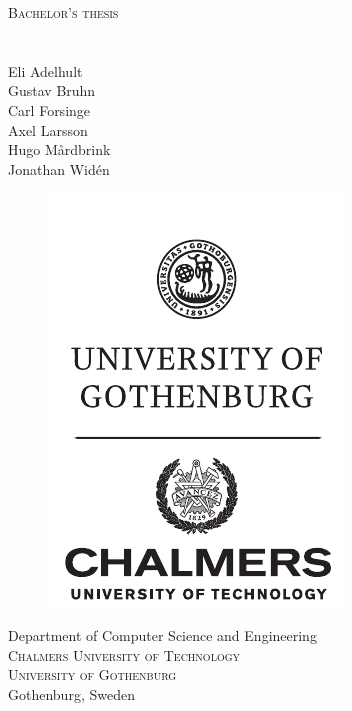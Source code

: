 \newpage
\restoregeometry
\thispagestyle{empty}
\mbox{}


\newpage
\thispagestyle{empty}
\begin{center}
	\textsc{\large Bachelor's thesis \the\year}\\[4cm]		%
	\textbf{\Large \multiLineTitle{0.2cm}} \\[1cm]
	{\large \oneLineSubtitle}\\[1cm]
	{\large Eli Adelhult}\\[1ex]
	{\large Gustav Bruhn}\\[1ex]
	{\large Carl Forsinge}\\[1ex]
	{\large Axel Larsson}\\[1ex]
	{\large Hugo Mårdbrink}\\[1ex]
	{\large Jonathan Widén}

	\vfill
	\begin{figure}[H]
	\centering
	\includegraphics[width=0.25\pdfpagewidth]{titlepage/ChGULogoHog.pdf}
	\end{figure}	\vspace{3mm}

	Department of Computer Science and Engineering\\
	\textsc{Chalmers University of Technology} \\
	\textsc{University of Gothenburg} \\
	Gothenburg, Sweden \the\year \\
\end{center}


